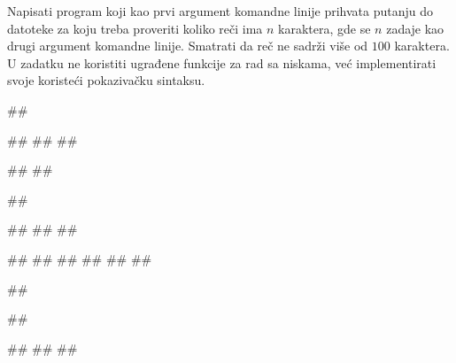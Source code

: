 \begin{Exercise}[label=2_06]
Napisati program koji kao prvi argument komandne linije prihvata
putanju do datoteke za koju treba proveriti koliko reči ima
$n$ karaktera, gde se $n$ zadaje kao drugi argument
komandne linije. Smatrati da reč ne sadrži više od $100$ karaktera.
U zadatku ne koristiti ugrađene funkcije za rad sa niskama, 
već implementirati svoje koristeći pokazivačku sintaksu.

\begin{miditest}
\begin{upotreba}{1}
##

##
##
##

#\naslovInt#
##
\end{upotreba}
\end{miditest}
\begin{miditest}
\begin{upotreba}{2}
##

##
##
##

#\naslovInt#
#\naslovIzlazZaGresku#
##
##
##
##
\end{upotreba}
\end{miditest}

\begin{miditest}
\begin{upotreba}{3}
##

##

#\naslovInt#
#\naslovIzlazZaGresku#
##
\end{upotreba}
\end{miditest}

\end{Exercise}
\begin{Answer}[ref=2_06]
\end{Answer}

